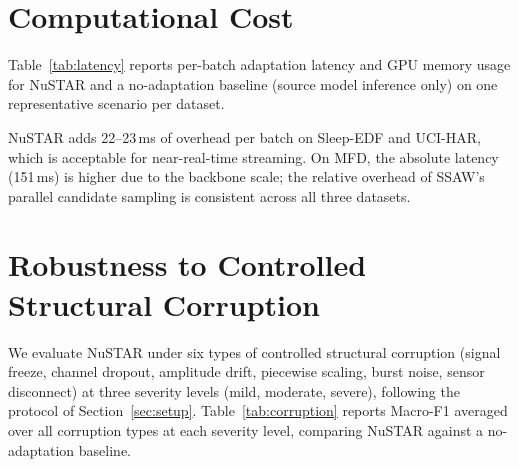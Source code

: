 \documentclass[sigconf, screen, review, anonymous]{acmart}
\theoremstyle{plain}
\theoremstyle{definition}
\theoremstyle{remark}
\begin{document}
\section{Computational Cost}
\label{app:cost}

Table~\ref{tab:latency} reports per-batch adaptation latency and GPU
memory usage for NuSTAR and a no-adaptation baseline (source model
inference only) on one representative scenario per dataset.

\begin{table}[h]
	\centering
	\caption{%
		\textbf{Per-batch latency and GPU memory.}
		NuSTAR adds moderate overhead on EEG and HAR.
		The higher absolute latency on MFD reflects the larger backbone
		architecture required for that dataset, not NuSTAR-specific cost.%
	}
	\label{tab:latency}
\end{table}

NuSTAR adds 22--23\,ms of overhead per batch on Sleep-EDF and UCI-HAR,
which is acceptable for near-real-time streaming.
On MFD, the absolute latency (151\,ms) is higher due to the backbone
scale; the relative overhead of SSAW's parallel candidate sampling
is consistent across all three datasets.

\section{Robustness to Controlled Structural Corruption}
\label{app:corruption}

We evaluate NuSTAR under six types of controlled structural corruption
(signal freeze, channel dropout, amplitude drift, piecewise scaling,
burst noise, sensor disconnect) at three severity levels (mild,
moderate, severe), following the protocol of
Section~\ref{sec:setup}.
Table~\ref{tab:corruption} reports Macro-F1 averaged over all
corruption types at each severity level, comparing NuSTAR against
a no-adaptation baseline.
\end{document}
